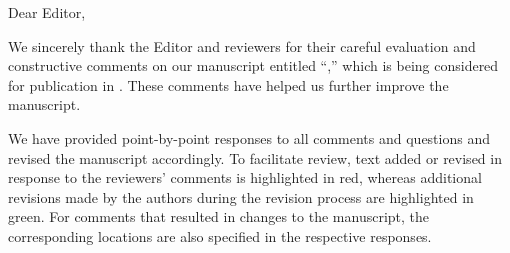 \documentclass[11pt]{article}
\begin{document}
Dear Editor,\par
\vspace{0.50\baselineskip}
We sincerely thank the Editor and reviewers for their careful evaluation and constructive comments on our manuscript entitled ``\ManuscriptTitle,'' which is being considered for publication in \textit{\JournalName}. These comments have helped us further improve the manuscript.\par
\vspace{0.62\baselineskip}
We have provided point-by-point responses to all comments and questions and revised the manuscript accordingly. To facilitate review, text added or revised in response to the reviewers' comments is highlighted in red, whereas additional revisions made by the authors during the revision process are highlighted in green. For comments that resulted in changes to the manuscript, the corresponding locations are also specified in the respective responses.\par
\vspace{1.05\baselineskip}
\CorrespondenceAuthorsEn

\clearpage

\end{document}
